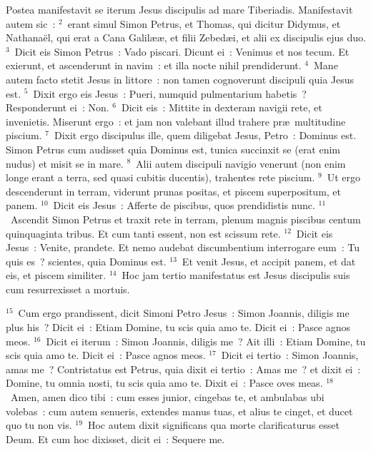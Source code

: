 \lettrine[lines=10,image=true,loversize=0.05,lraise=-0.03]{P}{}ostea manifestavit se iterum Jesus discipulis ad mare Tiberiadis. Manifestavit autem sic~:
${}^{2}$~erant simul Simon Petrus, et Thomas, qui dicitur Didymus, et Nathana\"el, qui erat a Cana Galil\ae \ae , et filii Zebed\ae i, et alii ex discipulis ejus duo.
${}^{3}$~Dicit eis Simon Petrus~: Vado piscari. Dicunt ei~: Venimus et nos tecum. Et exierunt, et ascenderunt in navim~: et illa nocte nihil prendiderunt.
${}^{4}$~Mane autem facto stetit Jesus in littore~: non tamen cognoverunt discipuli quia Jesus est.
${}^{5}$~Dixit ergo eis Jesus~: Pueri, numquid pulmentarium habetis~? Responderunt ei~: Non.
${}^{6}$~Dicit eis~: Mittite in dexteram navigii rete, et invenietis. Miserunt ergo~: et jam non valebant illud trahere pr\ae\ multitudine piscium.
${}^{7}$~Dixit ergo discipulus ille, quem diligebat Jesus, Petro~: Dominus est. Simon Petrus cum audisset quia Dominus est, tunica succinxit se (erat enim nudus) et misit se in mare.
${}^{8}$~Alii autem discipuli navigio venerunt (non enim longe erant a terra, sed quasi cubitis ducentis), trahentes rete piscium.
${}^{9}$~Ut ergo descenderunt in terram, viderunt prunas positas, et piscem superpositum, et panem.
${}^{10}$~Dicit eis Jesus~: Afferte de piscibus, quos prendidistis nunc.
${}^{11}$~Ascendit Simon Petrus et traxit rete in terram, plenum magnis piscibus centum quinquaginta tribus. Et cum tanti essent, non est scissum rete.
${}^{12}$~Dicit eis Jesus~: Venite, prandete. Et nemo audebat discumbentium interrogare eum~: Tu quis es~? scientes, quia Dominus est.
${}^{13}$~Et venit Jesus, et accipit panem, et dat eis, et piscem similiter.
${}^{14}$~Hoc jam tertio manifestatus est Jesus discipulis suis cum resurrexisset a mortuis.


${}^{15}$~Cum ergo prandissent, dicit Simoni Petro Jesus~: Simon Joannis, diligis me plus his~? Dicit ei~: Etiam Domine, tu scis quia amo te. Dicit ei~: Pasce agnos meos.
${}^{16}$~Dicit ei iterum~: Simon Joannis, diligis me~? Ait illi~: Etiam Domine, tu scis quia amo te. Dicit ei~: Pasce agnos meos.
${}^{17}$~Dicit ei tertio~: Simon Joannis, amas me~? Contristatus est Petrus, quia dixit ei tertio~: Amas me~? et dixit ei~: Domine, tu omnia nosti, tu scis quia amo te. Dixit ei~: Pasce oves meas.
${}^{18}$~Amen, amen dico tibi~: cum esses junior, cingebas te, et ambulabas ubi volebas~: cum autem senueris, extendes manus tuas, et alius te cinget, et ducet quo tu non vis.
${}^{19}$~Hoc autem dixit significans qua morte clarificaturus esset Deum. Et cum hoc dixisset, dicit ei~: Sequere me.


